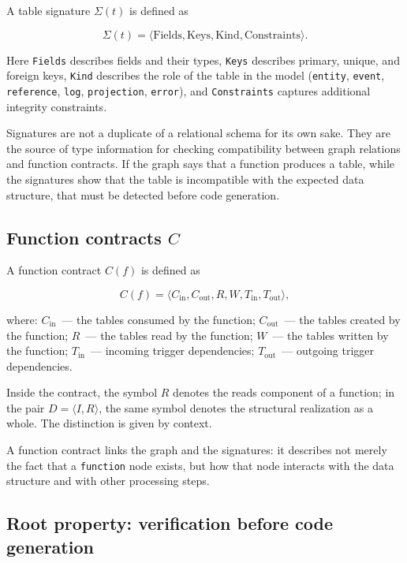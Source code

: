 \documentclass[12pt,a4paper]{article}
\begin{document}
A table signature $\Sigma(t)$ is defined as


$$\Sigma(t) = \langle \mathrm{Fields}, \mathrm{Keys}, \mathrm{Kind}, \mathrm{Constraints} \rangle.$$

Here \texttt{Fields} describes fields and their types, \texttt{Keys} describes primary, unique, and foreign keys, \texttt{Kind} describes the role of the table in the model (\texttt{entity}, \texttt{event}, \texttt{reference}, \texttt{log}, \texttt{projection}, \texttt{error}), and \texttt{Constraints} captures additional integrity constraints.

Signatures are not a duplicate of a relational schema for its own sake. They are the source of type information for checking compatibility between graph relations and function contracts. If the graph says that a function produces a table, while the signatures show that the table is incompatible with the expected data structure, that must be detected before code generation.

\subsection{Function contracts $C$}

A function contract $C(f)$ is defined as


$$C(f) = \langle C_{\mathrm{in}}, C_{\mathrm{out}}, R, W, T_{\mathrm{in}}, T_{\mathrm{out}} \rangle,$$

where: $C_{\mathrm{in}}$~--- the tables consumed by the function; $C_{\mathrm{out}}$~--- the tables created by the function; $R$~--- the tables read by the function; $W$~--- the tables written by the function; $T_{\mathrm{in}}$~--- incoming trigger dependencies; $T_{\mathrm{out}}$~--- outgoing trigger dependencies.

Inside the contract, the symbol $R$ denotes the reads component of a function; in the pair $D = \langle I, R \rangle$, the same symbol denotes the structural realization as a whole. The distinction is given by context.

A function contract links the graph and the signatures: it describes not merely the fact that a \texttt{function} node exists, but how that node interacts with the data structure and with other processing steps.

\subsection{Root property: verification before code generation}
\end{document}
